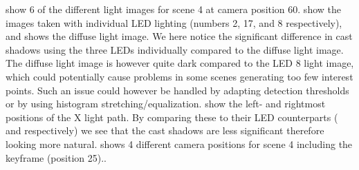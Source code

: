 \documentclass[thesis.tex]{subfiles}
\begin{document}
 show 6 of the different light images for scene 4 at camera position 60.  show the images taken with individual LED lighting (numbers 2, 17, and 8 respectively), and  shows the diffuse light image. We here notice the significant difference in cast shadows using the three LEDs individually compared to the diffuse light image. The diffuse light image is however quite dark compared to the LED 8 light image, which could potentially cause problems in some scenes generating too few interest points. Such an issue could however be handled by adapting detection thresholds or by using histogram stretching/equalization.
 show the left- and rightmost positions of the X light path. By comparing these to their LED counterparts ( and  respectively) we see that the cast shadows are less significant therefore looking more natural.
 shows 4 different camera positions for scene 4 including the keyframe (position 25)..
%
\end{document}
